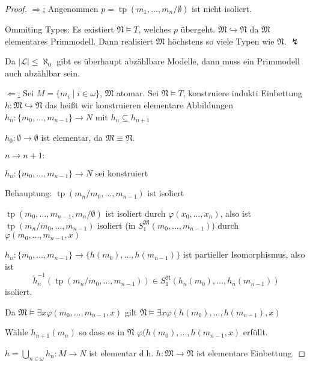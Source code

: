 \documentclass[12pt,parskip=full]{scrartcl}
\newcommand{\abs}[1]{{\left| #1 \right|}}
\newcommand{\heading}{\underline}
\theoremstyle{definition}
\begin{document}
	\begin{proof}
		\heading{$\Rightarrow$:} Angenommen $p = \operatorname{tp}(m_1, \dots, m_n / \emptyset)$ ist nicht isoliert.
		
		Ommiting Types: Es existiert $\mathfrak{N} \models T$, welches $p$ übergeht. $\mathfrak{M} \hookrightarrow \mathfrak{N}$ da $\mathfrak{M}$ elementares Primmodell. Dann realisiert $\mathfrak{M}$ höchstens so viele Typen wie $\mathfrak{N}$. $\lightning$
		
		Da $\abs{\mathcal{L}} \leq \aleph_0$ gibt es überhaupt abzählbare Modelle, dann muss ein Primmodell auch abzählbar sein.
		
		\heading{$\Leftarrow$:} Sei $M = \{ m_i \mid i \in \omega \}$, $\mathfrak{M}$ atomar. Sei $\mathfrak{N} \models T$, konstruiere indukti Einbettung $h: \mathfrak{M} \hookrightarrow \mathfrak{N}$ das heißt wir konstruieren elementare Abbildungen $h_n: \{ m_0, \dots, m_{n-1} \} \to N$ mit $h_n \subseteq h_{n+1}$
		
		$h_0: \emptyset \to \emptyset$ ist elementar, da $\mathfrak{M} \equiv \mathfrak{N}$.
		
		$n \to n+1:$
		
		$h_n: \{ m_0, \dots, m_{n-1} \} \to N$ sei konstruiert
		
		Behauptung: $\operatorname{tp}(m_n / m_0, \dots, m_{n-1})$ ist isoliert
		
		$\operatorname{tp}(m_0, \dots, m_{n-1}, m_n / \emptyset)$ ist isoliert durch $\varphi(x_0, \dots, x_n)$, also ist $\operatorname{tp}(m_n / m_0, \dots, m_{n-1})$ isoliert (in $S_1^\mathfrak{M}(m_0, \dots, m_{n-1})$) durch $\varphi(m_0, \dots, m_{n-1}, x)$
		
		$h_n: \{ m_0, \dots, m_{n-1} \} \to \{ h(m_0), \dots, h(m_{n-1}) \}$ ist partieller Isomorphismus, also ist
		\begin{equation*}
			\tilde{h}_n^{-1}(\operatorname{tp}(m_n / m_0, \dots, m_{n-1})) \in S_1^\mathfrak{N}(h_n(m_0), \dots, h_n(m_{n-1}))
		\end{equation*}
		isoliert.
		
		Da $\mathfrak{M} \models \exists x \varphi(m_0, \dots, m_{n-1}, x)$ gilt $\mathfrak{N} \models \exists x \varphi(h(m_0), \dots, h(m_{n-1}), x)$
		
		Wähle $h_{n+1}(m_n)$ so dass es in $\mathfrak{N}$ $\varphi(h(m_0), \dots, h(m_{n-1}, x)$ erfüllt.
		
		$h = \bigcup_{n \in \omega} h_n: M \to N$ ist elementar d.h. $h: \mathfrak{M} \to \mathfrak{N}$ ist elementare Einbettung.	
	\end{proof}
\end{document}

